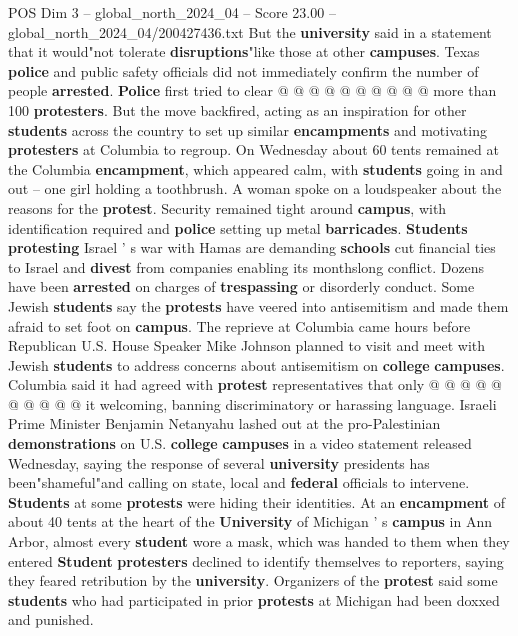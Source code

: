 \begin{textsample}{POS Dim 3 – global\_north\_2024\_04 – Score 23.00 – global\_north\_2024\_04/200427436.txt}
But the \textbf{university} said in a statement that it would"not tolerate \textbf{disruptions}"like those at other \textbf{campuses}.
Texas \textbf{police} and public safety officials did not immediately confirm the number of people \textbf{arrested}. \textbf{Police} first tried to clear @ @ @ @ @ @ @ @ @ @ more than 100 \textbf{protesters}.
But the move backfired, acting as an inspiration for other \textbf{students} across the country to set up similar \textbf{encampments} and motivating \textbf{protesters} at Columbia to regroup.
On Wednesday about 60 tents remained at the Columbia \textbf{encampment}, which appeared calm, with \textbf{students} going in and out -- one girl holding a toothbrush.
A woman spoke on a loudspeaker about the reasons for the \textbf{protest}.
Security remained tight around \textbf{campus}, with identification required and \textbf{police} setting up metal \textbf{barricades}. \textbf{Students} \textbf{protesting} Israel ' s war with Hamas are demanding \textbf{schools} cut financial ties to Israel and \textbf{divest} from companies enabling its monthslong conflict.
Dozens have been \textbf{arrested} on charges of \textbf{trespassing} or disorderly conduct.
Some Jewish \textbf{students} say the \textbf{protests} have veered into antisemitism and made them afraid to set foot on \textbf{campus}.
The reprieve at Columbia came hours before Republican U.S.
House Speaker Mike Johnson planned to visit and meet with Jewish \textbf{students} to address concerns about antisemitism on \textbf{college} \textbf{campuses}.
Columbia said it had agreed with \textbf{protest} representatives that only @ @ @ @ @ @ @ @ @ @ it welcoming, banning discriminatory or harassing language.
Israeli Prime Minister Benjamin Netanyahu lashed out at the pro-Palestinian \textbf{demonstrations} on U.S. \textbf{college} \textbf{campuses} in a video statement released Wednesday, saying the response of several \textbf{university} presidents has been"shameful"and calling on state, local and \textbf{federal} officials to intervene. \textbf{Students} at some \textbf{protests} were hiding their identities.
At an \textbf{encampment} of about 40 tents at the heart of the \textbf{University} of Michigan ' s \textbf{campus} in Ann Arbor, almost every \textbf{student} wore a mask, which was handed to them when they entered \textbf{Student} \textbf{protesters} declined to identify themselves to reporters, saying they feared retribution by the \textbf{university}.
Organizers of the \textbf{protest} said some \textbf{students} who had participated in prior \textbf{protests} at Michigan had been doxxed and punished.

\end{textsample}
